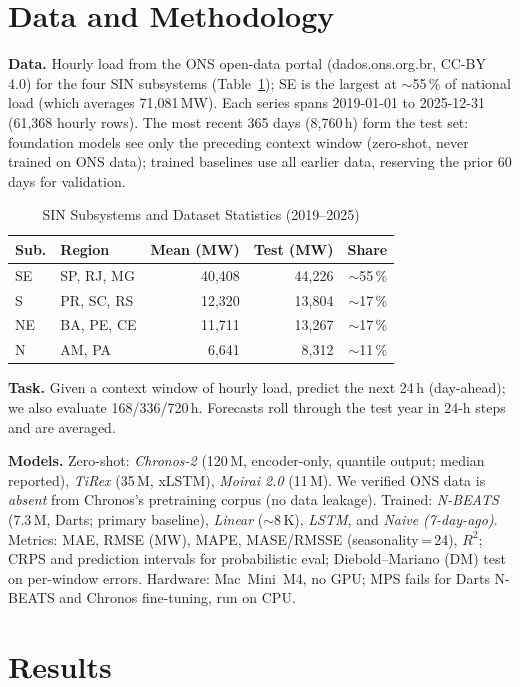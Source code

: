 \documentclass[conference]{IEEEtran}
\begin{document}
\section{Data and Methodology}
\textbf{Data.} Hourly load from the ONS open-data portal (dados.ons.org.br, CC-BY 4.0)
for the four SIN subsystems (Table~\ref{tab:data}); SE is the largest at $\sim$55\,\% of
national load (which averages 71{,}081\,MW). Each series spans 2019-01-01 to 2025-12-31
(61{,}368 hourly rows). The most recent 365 days (8{,}760\,h) form the test set:
foundation models see only the preceding context window (zero-shot, never trained on ONS
data); trained baselines use all earlier data, reserving the prior 60 days for
validation.

\begin{table}[t]
\centering
\caption{SIN Subsystems and Dataset Statistics (2019--2025)}
\label{tab:data}
\begin{tabular}{llrrr}
\toprule
Sub. & Region & Mean (MW) & Test (MW) & Share \\
\midrule
SE & SP, RJ, MG & 40{,}408 & 44{,}226 & $\sim$55\,\% \\
S  & PR, SC, RS & 12{,}320 & 13{,}804 & $\sim$17\,\% \\
NE & BA, PE, CE & 11{,}711 & 13{,}267 & $\sim$17\,\% \\
N  & AM, PA     &  6{,}641 &  8{,}312 & $\sim$11\,\% \\
\bottomrule
\end{tabular}
\end{table}

\textbf{Task.} Given a context window of hourly load, predict the next 24\,h
(day-ahead); we also evaluate 168/336/720\,h. Forecasts roll through the test year in
24-h steps and are averaged.

\textbf{Models.} Zero-shot: \emph{Chronos-2} (120\,M, encoder-only, quantile output;
median reported), \emph{TiRex} (35\,M, xLSTM), \emph{Moirai 2.0} (11\,M). We verified
ONS data is \emph{absent} from Chronos's pretraining corpus \cite{chronos,bolt}
(no data leakage). Trained: \emph{N-BEATS} (7.3\,M, Darts; primary baseline),
\emph{Linear} ($\sim$8\,K), \emph{LSTM}, and \emph{Naive (7-day-ago)}. Metrics: MAE,
RMSE (MW), MAPE, MASE/RMSSE (seasonality\,=\,24), $R^2$; CRPS and prediction intervals
for probabilistic eval; Diebold--Mariano (DM) test on per-window errors. Hardware:
Mac~Mini~M4, no GPU; MPS fails for Darts N-BEATS and Chronos fine-tuning, run on CPU.

\section{Results}
\end{document}

